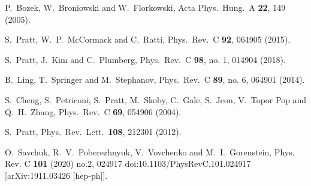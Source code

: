 \begin{thebibliography}{99}
  P.~Bozek, W.~Broniowski and W.~Florkowski,
  Acta Phys.\ Hung.\ A {\bf 22}, 149 (2005).
 
  S.~Pratt, W.~P.~McCormack and C.~Ratti,
  Phys.\ Rev.\ C {\bf 92}, 064905 (2015).

  S.~Pratt, J.~Kim and C.~Plumberg,
  Phys.\ Rev.\ C {\bf 98}, no. 1, 014904 (2018).

  B.~Ling, T.~Springer and M.~Stephanov,
  Phys.\ Rev.\ C {\bf 89}, no. 6, 064901 (2014).


  S.~Cheng, S.~Petriconi, S.~Pratt, M.~Skoby, C.~Gale, S.~Jeon, V.~Topor Pop and Q.~H.~Zhang,
  Phys.\ Rev.\ C {\bf 69}, 054906 (2004).

  S.~Pratt,
  Phys.\ Rev.\ Lett.\  {\bf 108}, 212301 (2012).

O.~Savchuk, R.~V.~Poberezhnyuk, V.~Vovchenko and M.~I.~Gorenstein,
Phys. Rev. C \textbf{101} (2020) no.2, 024917
doi:10.1103/PhysRevC.101.024917
[arXiv:1911.03426 [hep-ph]].


\end{thebibliography}
